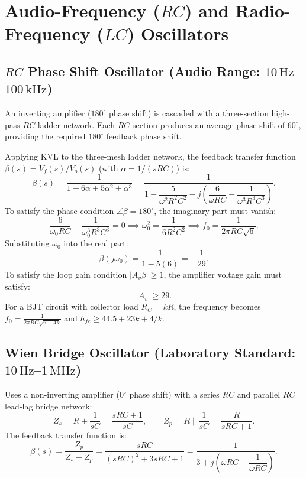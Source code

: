 \documentclass[12pt,a4paper]{article}
\begin{document}
\section{Audio-Frequency ($RC$) and Radio-Frequency ($LC$) Oscillators}

\subsection{$RC$ Phase Shift Oscillator (Audio Range: $10\,\mathrm{Hz}$--$100\,\mathrm{kHz}$)}
An inverting amplifier ($180^\circ$ phase shift) is cascaded with a three-section high-pass $RC$ ladder network. Each $RC$ section produces an average phase shift of $60^\circ$, providing the required $180^\circ$ feedback phase shift.

\begin{tcolorbox}[formulabox, title={Derivation of $RC$ Phase Shift Oscillator Frequency}]
Applying KVL to the three-mesh ladder network, the feedback transfer function $\beta(s) = V_f(s)/V_o(s)$ (with $\alpha = 1/(sRC)$) is:
\[
\beta(s) = \frac{1}{1 + 6\alpha + 5\alpha^2 + \alpha^3} = \frac{1}{1 - \dfrac{5}{\omega^2 R^2 C^2} - j\left(\dfrac{6}{\omega R C} - \dfrac{1}{\omega^3 R^3 C^3}\right)}.
\]
To satisfy the phase condition $\angle \beta = 180^\circ$, the imaginary part must vanish:
\[
\frac{6}{\omega_0 R C} - \frac{1}{\omega_0^3 R^3 C^3} = 0 \implies \omega_0^2 = \frac{1}{6 R^2 C^2} \implies f_0 = \frac{1}{2\pi R C \sqrt{6}}.
\]
Substituting $\omega_0$ into the real part:
\[
\beta(j\omega_0) = \frac{1}{1 - 5(6)} = -\frac{1}{29}.
\]
To satisfy the loop gain condition $|A_v \beta| \ge 1$, the amplifier voltage gain must satisfy:
\[
|A_v| \ge 29.
\]
For a BJT circuit with collector load $R_C = k R$, the frequency becomes $f_0 = \frac{1}{2\pi R C \sqrt{6 + 4k}}$ and $h_{fe} \ge 44.5 + 23k + 4/k$.
\end{tcolorbox}

\subsection{Wien Bridge Oscillator (Laboratory Standard: $10\,\mathrm{Hz}$--$1\,\mathrm{MHz}$)}
Uses a non-inverting amplifier ($0^\circ$ phase shift) with a series $RC$ and parallel $RC$ lead-lag bridge network:
\[
Z_s = R + \frac{1}{sC} = \frac{sRC + 1}{sC},\qquad
Z_p = R \parallel \frac{1}{sC} = \frac{R}{sRC + 1}.
\]
The feedback transfer function is:
\[
\beta(s) = \frac{Z_p}{Z_s + Z_p} = \frac{sRC}{(sRC)^2 + 3sRC + 1} = \frac{1}{3 + j\left(\omega RC - \dfrac{1}{\omega RC}\right)}.
\]
\end{document}
